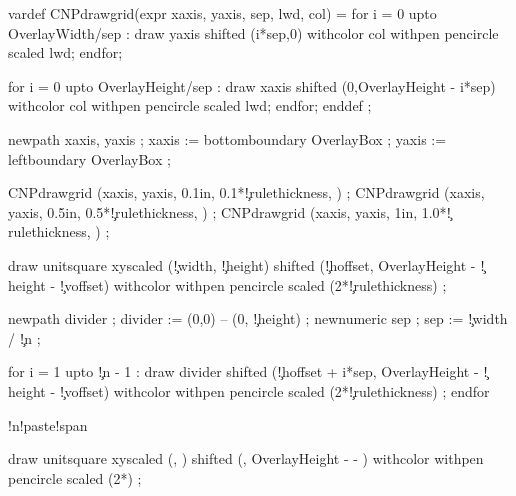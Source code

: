 
\unprotect

\setupcolors[state=start]


\startMPinclusions[+]
  vardef CNPdrawgrid(expr xaxis, yaxis, sep, lwd, col) =
    for i = 0 upto OverlayWidth/sep :
      draw yaxis shifted (i*sep,0) withcolor col withpen pencircle scaled lwd;
    endfor; 

    for i = 0 upto OverlayHeight/sep :
      draw xaxis shifted (0,OverlayHeight - i*sep) withcolor col withpen pencircle scaled lwd;
    endfor; 
  enddef ;
\stopMPinclusions

  newpath xaxis, yaxis ; 
  xaxis := bottomboundary OverlayBox ;
  yaxis := leftboundary   OverlayBox ;

  CNPdrawgrid (xaxis, yaxis, 0.1in, 0.1*\MPvar\c!rulethickness, ) ;
  CNPdrawgrid (xaxis, yaxis, 0.5in, 0.5*\MPvar\c!rulethickness, ) ;
  CNPdrawgrid (xaxis, yaxis, 1in,   1.0*\MPvar\c!rulethickness, ) ;

  draw unitsquare xyscaled (\MPvar\c!width, \MPvar\c!height) 
       shifted (\MPvar\c!hoffset, OverlayHeight - \MPvar\c!height - \MPvar\c!voffset) 
       withcolor 
       withpen pencircle scaled (2*\MPvar\c!rulethickness) ;

  newpath divider ; 
  divider := (0,0) -- (0, \MPvar\c!height) ;
  newnumeric sep ; sep := \MPvar\c!width / \MPvar\c!n ;

  for i = 1 upto \MPvar\c!n - 1 :
    draw divider
         shifted (\MPvar\c!hoffset + i*sep, 
                  OverlayHeight - \MPvar\c!height - \MPvar\c!voffset) 
     withcolor 
     withpen pencircle scaled (2*\MPvar\c!rulethickness) ;
  endfor 
       

  \ifconditional\cut!n!paste!span

  draw unitsquare xyscaled (, ) 
       shifted (, OverlayHeight -  - ) 
       withcolor 
       withpen pencircle scaled (2*) ;
  \fi

